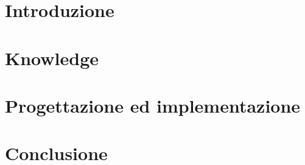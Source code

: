 \documentclass[11pt]{report}
\author{Matteo Cetraro, Massimiliano Sampaolo}
\begin{document}

\tableofcontents
\chapter{Introduzione}

\chapter{Knowledge}

\chapter{Progettazione ed implementazione}

\chapter{Conclusione}

\end{document}
